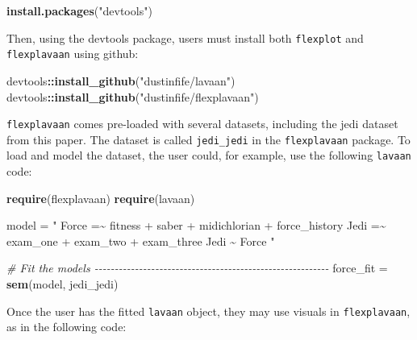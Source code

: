 \documentclass[
  english,
  man]{apa6}
\newenvironment{Shaded}{\begin{snugshade}}{\end{snugshade}}
\newcommand{\CommentTok}[1]{\textcolor[rgb]{0.56,0.35,0.01}{\textit{#1}}}
\newcommand{\KeywordTok}[1]{\textcolor[rgb]{0.13,0.29,0.53}{\textbf{#1}}}
\newcommand{\NormalTok}[1]{#1}
\newcommand{\OperatorTok}[1]{\textcolor[rgb]{0.81,0.36,0.00}{\textbf{#1}}}
\newcommand{\StringTok}[1]{\textcolor[rgb]{0.31,0.60,0.02}{#1}}
\begin{document}
\begin{Shaded}
\begin{Highlighting}[]
\KeywordTok{install.packages}\NormalTok{(}\StringTok{"devtools"}\NormalTok{)}
\end{Highlighting}
\end{Shaded}

Then, using the devtools package, users must install both \texttt{flexplot} and \texttt{flexplavaan} using github:

\begin{Shaded}
\begin{Highlighting}[]
\NormalTok{devtools}\OperatorTok{::}\KeywordTok{install\_github}\NormalTok{(}\StringTok{"dustinfife/lavaan"}\NormalTok{)}
\NormalTok{devtools}\OperatorTok{::}\KeywordTok{install\_github}\NormalTok{(}\StringTok{"dustinfife/flexplavaan"}\NormalTok{)}
\end{Highlighting}
\end{Shaded}

\texttt{flexplavaan} comes pre-loaded with several datasets, including the jedi dataset from this paper. The dataset is called \texttt{jedi\_jedi} in the \texttt{flexplavaan} package. To load and model the dataset, the user could, for example, use the following \texttt{lavaan} code:

\begin{Shaded}
\begin{Highlighting}[]
\KeywordTok{require}\NormalTok{(flexplavaan)}
\KeywordTok{require}\NormalTok{(lavaan)}

\NormalTok{model =}\StringTok{ "}
\StringTok{Force =\textasciitilde{} fitness + saber + midichlorian + force\_history}
\StringTok{Jedi =\textasciitilde{} exam\_one + exam\_two + exam\_three}
\StringTok{Jedi \textasciitilde{} Force}
\StringTok{"}

\CommentTok{\# Fit the models {-}{-}{-}{-}{-}{-}{-}{-}{-}{-}{-}{-}{-}{-}{-}{-}{-}{-}{-}{-}{-}{-}{-}{-}{-}{-}{-}{-}{-}{-}{-}{-}{-}{-}{-}{-}{-}{-}{-}{-}{-}{-}{-}{-}{-}{-}{-}{-}{-}{-}{-}{-}{-}{-}{-}{-}{-}{-}}
\NormalTok{force\_fit =}\StringTok{ }\KeywordTok{sem}\NormalTok{(model, jedi\_jedi)}
\end{Highlighting}
\end{Shaded}

Once the user has the fitted \texttt{lavaan} object, they may use visuals in \texttt{flexplavaan}, as in the following code:
\end{document}
